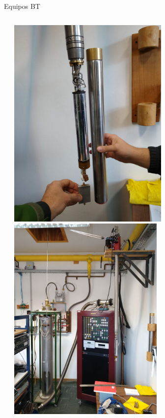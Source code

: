 \documentclass[ignorenonframetext,12pt]{beamer}
\begin{document}
\begin{frame}{Equipos BT}
\begin{columns}
\begin{column}{0.45\textwidth}
								\end{column}
								\begin{column}{0.45\textwidth}
												\includegraphics[angle=-90, width=0.62\textwidth]{IMG_20190523_105443289} \\ 
												\includegraphics[angle=-90,width=0.6\textwidth]{IMG_20190523_105117465}
								\end{column}
				\end{columns}


%
%
%
%
\end{frame}
\end{document}
